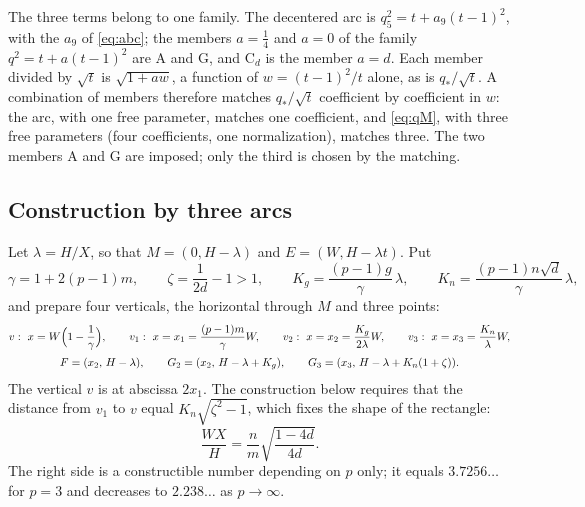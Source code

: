 The three terms belong to one family. The decentered arc is $q_5^{2}=t+a_9(t-1)^{2}$, with the $a_9$ of
\eqref{eq:abc}; the members $a=\tfrac14$ and $a=0$ of the family $q^{2}=t+a(t-1)^{2}$ are $\mathrm A$
and $\mathrm G$, and $\mathrm C_d$ is the member $a=d$. Each member divided by $\sqrt t$ is
$\sqrt{1+aw}$, a function of $w=(t-1)^{2}/t$ alone, as is $q_*/\sqrt t$. A combination of members
therefore matches $q_*/\sqrt t$ coefficient by coefficient in $w$: the arc, with one free parameter,
matches one coefficient, and \eqref{eq:qM}, with three free parameters (four coefficients, one
normalization), matches three. The two members $\mathrm A$ and $\mathrm G$ are imposed; only the third
is chosen by the matching.

\subsection{Construction by three arcs}\label{sec:mean-construction}

Let $\lambda=H/X$, so that $M=(0,H-\lambda)$ and $E=(W,H-\lambda t)$. Put
\[ \gamma=1+2(p-1)m,\qquad \zeta=\frac1{2d}-1>1,\qquad K_g=\frac{(p-1)g}{\gamma}\,\lambda,\qquad
K_n=\frac{(p-1)n\sqrt d}{\gamma}\,\lambda , \]
and prepare four verticals, the horizontal through $M$ and three points:
\[ \begin{gathered}
v:\ x=W\Bigl(1-\frac1\gamma\Bigr),\qquad v_1:\ x=x_1=\frac{(p-1)m}{\gamma}W,\qquad
v_2:\ x=x_2=\frac{K_g}{2\lambda}W,\qquad v_3:\ x=x_3=\frac{K_n}{\lambda}W,\\[2pt]
F=(x_2,\,H-\lambda),\qquad G_2=(x_2,\,H-\lambda+K_g),\qquad G_3=(x_3,\,H-\lambda+K_n(1+\zeta)).
\end{gathered} \]
The vertical $v$ is at abscissa $2x_1$. The construction below requires that the distance from $v_1$ to
$v$ equal $K_n\sqrt{\zeta^{2}-1}$, which fixes the shape of the rectangle:
\begin{equation}\label{eq:aspect}
\frac{WX}{H}=\frac nm\sqrt{\frac{1-4d}{4d}} .
\end{equation}
The right side is a constructible number depending on $p$ only; it equals $3.7256\ldots$ for $p=3$ and
decreases to $2.238\ldots$ as $p\to\infty$.

